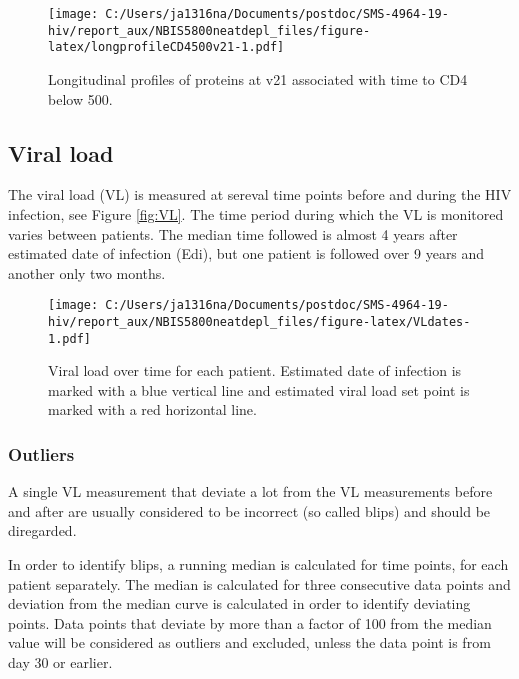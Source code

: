 \documentclass[
]{article}
\begin{document}
\begin{figure}
\centering
\texttt{[image: C:/Users/ja1316na/Documents/postdoc/SMS-4964-19-hiv/report\_aux/NBIS5800neatdepl\_files/figure-latex/longprofileCD4500v21-1.pdf]}
\caption{\label{fig:longprofileCD4500v21}Longitudinal profiles of proteins at v21 associated with time to CD4 below 500.}
\end{figure}

\FloatBarrier

\hypertarget{viral-load}{%
\subsection{Viral load}\label{viral-load}}

The viral load (VL) is measured at sereval time points before and during the HIV infection, see Figure \ref{fig:VL}. The time period during which the VL is monitored varies between patients. The median time followed is almost 4 years after estimated date of infection (Edi), but one patient is followed over 9 years and another only two months.

\begin{figure}
\centering
\texttt{[image: C:/Users/ja1316na/Documents/postdoc/SMS-4964-19-hiv/report\_aux/NBIS5800neatdepl\_files/figure-latex/VLdates-1.pdf]}
\caption{\label{fig:VLdates}Viral load over time for each patient. Estimated date of infection is marked with a blue vertical line and estimated viral load set point is marked with a red horizontal line.}
\end{figure}

\FloatBarrier

\hypertarget{outliers}{%
\subsubsection{Outliers}\label{outliers}}

A single VL measurement that deviate a lot from the VL measurements before and after are usually considered to be incorrect (so called blips) and should be diregarded.

In order to identify blips, a running median is calculated for time points, for each patient separately. The median is calculated for three consecutive data points and deviation from the median curve is calculated in order to identify deviating points. Data points that deviate by more than a factor of 100 from the median value will be considered as outliers and excluded, unless the data point is from day 30 or earlier.
\end{document}
